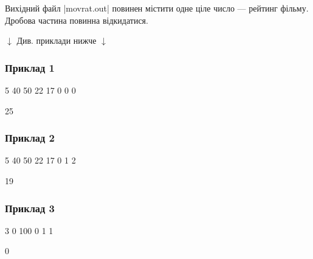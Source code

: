 \documentclass[12pt,a4paper]{article}
\begin{document}
Вихідний файл |movrat.out| повинен містити одне ціле число --- рейтинг фільму. Дробова частина повинна відкидатися.


\begin{pagebottomtext}
$\downarrow$ Див. приклади нижче $\downarrow$
\end{pagebottomtext}


\pagebreak


\subsubsection*{Приклад 1}

\textbf{}

\begin{codeblock}
5
40 50 22 17 0
0
0
\end{codeblock}

\textbf{}

\begin{codeblock}
25
\end{codeblock}


\subsubsection*{Приклад 2}

\textbf{}

\begin{codeblock}
5
40 50 22 17 0
1
2
\end{codeblock}

\textbf{}

\begin{codeblock}
19
\end{codeblock}


\subsubsection*{Приклад 3}

\textbf{}

\begin{codeblock}
3
0 100 0
1
1
\end{codeblock}

\textbf{}

\begin{codeblock}
0
\end{codeblock}
\end{document}
